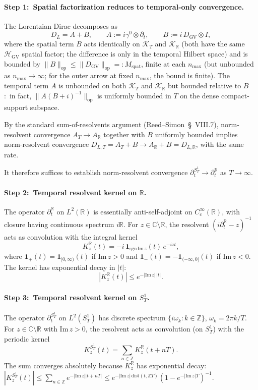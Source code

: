 \documentclass[11pt,a4paper]{article}
\theoremstyle{plain}
\theoremstyle{definition}
\newcommand{\nmax}{n_{\max}}
\newcommand{\Sone}{S^{1}}
\newcommand{\SoneT}{S^{1}_{T}}
\newcommand{\Krein}{\mathcal{K}}
\newcommand{\opnorm}[1]{\lVert #1 \rVert_{\mathrm{op}}}
\newcommand{\R}{\mathbb{R}}
\newcommand{\C}{\mathbb{C}}
\newcommand{\Z}{\mathbb{Z}}
\newcommand{\DGV}{D_{\mathrm{GV}}}
\newcommand{\DL}{D_{L}}
\newcommand{\DLR}{D_{L,\R}}
\newcommand{\DLT}{D_{L,T}}
\newcommand{\HGV}{\mathcal{H}_{\mathrm{GV}}}
\newcommand{\spat}{\mathrm{spat}}
\begin{document}
\paragraph*{Step 1:\ Spatial factorization reduces to temporal-only
convergence.}
The Lorentzian Dirac decomposes as
\[
\DL = A + B, \qquad A := i\gamma^{0}\otimes\partial_{t},
\qquad B := i\,\DGV\otimes I,
\]
where the spatial term $B$ acts identically on $\Krein_{T}$ and
$\Krein_{\R}$ (both have the same $\HGV$ spatial factor; the difference
is only in the temporal Hilbert space) and is bounded by
$\opnorm{B} \le \opnorm{\DGV} =: M_{\spat}$, finite at each $\nmax$
(but unbounded as $\nmax \to \infty$; for the outer arrow at fixed
$\nmax$, the bound is finite). The temporal term $A$ is unbounded on
both $\Krein_{T}$ and $\Krein_{\R}$ but bounded relative to
$B$:\ in fact, $\opnorm{A(B + i)^{-1}}$ is uniformly bounded in $T$ on
the dense compact-support subspace.

By the standard sum-of-resolvents argument
(Reed--Simon~\S~VIII.7), norm-resolvent convergence
$A_{T} \to A_{\R}$ together with $B$ uniformly bounded implies
norm-resolvent convergence $\DLT = A_{T} + B \to A_{\R} + B = \DLR$,
with the same rate.

It therefore suffices to establish norm-resolvent convergence
$\partial_{t}^{\Sone_{T}} \to \partial_{t}^{\R}$ as $T \to \infty$.

\paragraph*{Step 2:\ Temporal resolvent kernel on $\R$.}
The operator $\partial_{t}^{\R}$ on $L^{2}(\R)$ is essentially
anti-self-adjoint on $C_{c}^{\infty}(\R)$, with closure having
continuous spectrum $i\R$. For $z \in \C\setminus\R$, the resolvent
$(i\partial_{t}^{\R} - z)^{-1}$ acts as convolution with the integral
kernel
\begin{equation}\label{eq:R_kernel}
K_{z}^{\R}(t) = -i\,\mathbf{1}_{\mathrm{sgn}\,\mathrm{Im}\,z}(t)\,
e^{-i z t},
\end{equation}
where $\mathbf{1}_{+}(t) = \mathbf{1}_{[0,\infty)}(t)$ if $\mathrm{Im}\,z
> 0$ and $\mathbf{1}_{-}(t) = -\mathbf{1}_{(-\infty,0]}(t)$ if
$\mathrm{Im}\,z < 0$. The kernel has exponential decay in $|t|$:
\[
|K_{z}^{\R}(t)| \le e^{-|\mathrm{Im}\,z|\,|t|}.
\]

\paragraph*{Step 3:\ Temporal resolvent kernel on $\SoneT$.}
The operator $\partial_{t}^{\Sone_{T}}$ on $L^{2}(\SoneT)$ has discrete
spectrum $\{i\omega_{k} : k \in \Z\}$, $\omega_{k} = 2\pi k/T$. For
$z \in \C\setminus\R$ with $\mathrm{Im}\,z > 0$, the resolvent acts as
convolution (on $\SoneT$) with the periodic kernel
\begin{equation}\label{eq:Sone_kernel}
K_{z}^{\SoneT}(t) = \sum_{n \in \Z} K_{z}^{\R}(t + nT).
\end{equation}
The sum converges absolutely because $K_{z}^{\R}$ has exponential
decay:\ $|K_{z}^{\SoneT}(t)| \le \sum_{n \in \Z} e^{-|\mathrm{Im}\,z|
|t + nT|} \le e^{-|\mathrm{Im}\,z| \,\mathrm{dist}(t,\Z T)}
(1 - e^{-|\mathrm{Im}\,z| T})^{-1}$.
\end{document}
